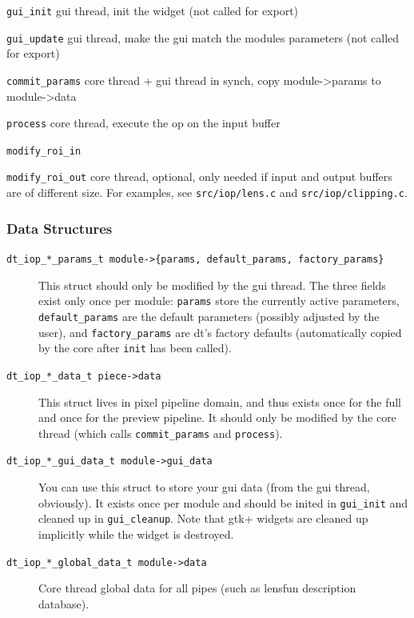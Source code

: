 \documentclass[a4paper,twoside]{scrartcl}
\newcommand{\code}[1]{\texttt{\color{codecol}#1}}
\begin{document}
\begin{description}
  \item \code{gui\_init} gui thread, init the widget (not called for export)
  \item \code{gui\_update} gui thread, make the gui match the modules parameters (not called for export)
  \item \code{commit\_params} core thread + gui thread in synch, copy module->params to module->data
  \item \code{process} core thread, execute the op on the input buffer
  \item \code{modify\_roi\_in}
  \item \code{modify\_roi\_out} core thread, optional, only needed if input and output buffers are of different size.
    For examples, see \code{src/iop/lens.c} and \code{src/iop/clipping.c}.
\end{description}

\subsubsection{Data Structures}

\begin{description}
  \item[\code{dt\_iop\_*\_params\_t module->\{params, default\_params, factory\_params\}}]

  This struct should only be modified by the gui thread. The three fields exist only once per module: \code{params}
  store the currently active parameters, \code{default\_params} are the default parameters (possibly adjusted by the
  user), and \code{factory\_params} are dt's factory defaults (automatically copied by the core after \code{init} has been
  called).

  \item[\code{dt\_iop\_*\_data\_t piece->data}]
  This struct lives in pixel pipeline domain, and thus exists once for the full and once for the preview pipeline.
  It should only be modified by the core thread (which calls \code{commit\_params} and \code{process}).

  \item[\code{dt\_iop\_*\_gui\_data\_t module->gui\_data}]
  You can use this struct to store your gui data (from the gui thread, obviously). It exists once per module and should be inited in \code{gui\_init} and
  cleaned up in \code{gui\_cleanup}. Note that gtk+ widgets are cleaned up implicitly while the widget is destroyed.

  \item[\code{dt\_iop\_*\_global\_data\_t module->data}]
  Core thread global data for all pipes (such as lensfun description database).
\end{description}
\end{document}
